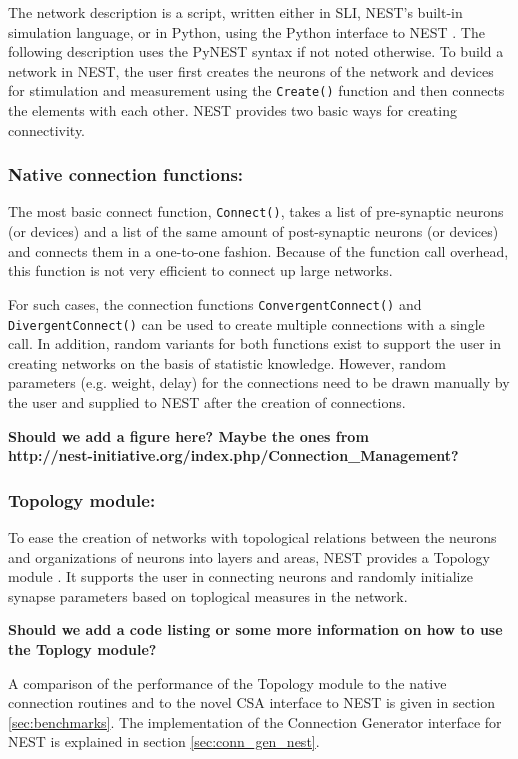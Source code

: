 \documentclass{frontiersSCNS} %
\newcommand{\tbw}[1]{{\bf\parindent0pt\color{red}#1}}
\begin{document}
The network description is a script, written either in SLI, NEST's
built-in simulation language, or in Python, using the Python interface
to NEST \citep[PyNEST;][]{Eppler09_12}. The following description uses
the PyNEST syntax if not noted otherwise. To build a network in NEST,
the user first creates the neurons of the network and devices for
stimulation and measurement using the \texttt{Create()} function and
then connects the elements with each other. NEST provides two basic
ways for creating connectivity.

\subsubsection*{Native connection functions:}

The most basic connect function, \texttt{Connect()}, takes a list of
pre-synaptic neurons (or devices) and a list of the same amount of
post-synaptic neurons (or devices) and connects them in a one-to-one
fashion. Because of the function call overhead, this function is not
very efficient to connect up large networks.

For such cases, the connection functions \texttt{ConvergentConnect()}
and \texttt{DivergentConnect()} can be used to create multiple
connections with a single call. In addition, random variants for both
functions exist to support the user in creating networks on the basis
of statistic knowledge. However, random parameters (e.g. weight,
delay) for the connections need to be drawn manually by the user and
supplied to NEST after the creation of connections.

\tbw{Should we add a figure here? Maybe the ones
  from\\ http://nest-initiative.org/index.php/Connection\_Management?}

\subsubsection*{Topology module:}

To ease the creation of networks with topological relations between
the neurons and organizations of neurons into layers and areas, NEST
provides a Topology module \citep{Plesser_13}. It supports the user in
connecting neurons and randomly initialize synapse parameters based on
toplogical measures in the network.

\tbw{Should we add a code listing or some more information on how to
  use the Toplogy module?}

A comparison of the performance of the Topology module to the native
connection routines and to the novel CSA interface to NEST is given in
section \ref{sec:benchmarks}. The implementation of the Connection
Generator interface for NEST is explained in section
\ref{sec:conn_gen_nest}.
\end{document}
